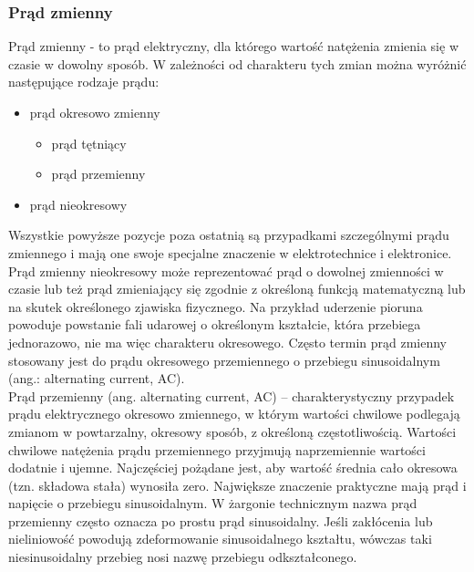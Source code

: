 \documentclass[12pt]{article}
\begin{document}
\subsubsection{Prąd zmienny}
Prąd zmienny - to prąd elektryczny, dla którego wartość natężenia zmienia się w czasie w dowolny sposób. W zależności od charakteru tych zmian można wyróżnić następujące rodzaje prądu:
\begin{itemize}[noitemsep]
    \item prąd okresowo zmienny
    \begin{itemize}[noitemsep]
        \item prąd tętniący
        \item prąd przemienny
    \end{itemize}
    \item prąd nieokresowy
\end{itemize}
Wszystkie powyższe pozycje poza ostatnią są przypadkami szczególnymi prądu zmiennego i mają one swoje specjalne znaczenie w elektrotechnice i elektronice. Prąd zmienny nieokresowy może reprezentować prąd o dowolnej zmienności w czasie lub też prąd zmieniający się zgodnie z określoną funkcją matematyczną lub na skutek określonego zjawiska fizycznego. Na przykład uderzenie pioruna powoduje powstanie fali udarowej o określonym kształcie, która przebiega jednorazowo, nie ma więc charakteru okresowego. Często termin prąd zmienny stosowany jest do prądu okresowego przemiennego o przebiegu sinusoidalnym (ang.: alternating current, AC).\\
Prąd przemienny (ang. alternating current, AC) – charakterystyczny przypadek prądu elektrycznego okresowo zmiennego, w którym wartości chwilowe podlegają zmianom w powtarzalny, okresowy sposób, z określoną częstotliwością. Wartości chwilowe natężenia prądu przemiennego przyjmują naprzemiennie wartości dodatnie i ujemne. Najczęściej pożądane jest, aby wartość średnia cało okresowa (tzn. składowa stała) wynosiła zero. Największe znaczenie praktyczne mają prąd i napięcie o przebiegu sinusoidalnym. W żargonie technicznym nazwa prąd przemienny często oznacza po prostu prąd sinusoidalny. Jeśli zakłócenia lub nieliniowość powodują zdeformowanie sinusoidalnego kształtu, wówczas taki niesinusoidalny przebieg nosi nazwę przebiegu odkształconego.
\end{document}
